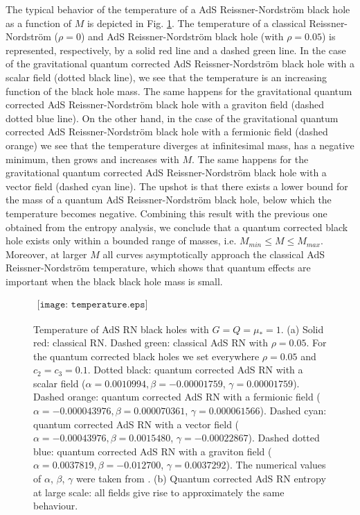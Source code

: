 \documentclass[10pt,a4paper]{article}
\begin{document}
The typical behavior of the temperature of a AdS Reissner-Nordstr\"om black hole as a function of $M$ is depicted in Fig. \ref{fig3}. The temperature of a classical Reissner-Nordstr\"om ($\rho=0$) and AdS Reissner-Nordstr\"om black hole (with $\rho=0.05$) is represented, respectively, by a solid red line and a dashed green line. 
In the case of the gravitational quantum corrected AdS Reissner-Nordstr\"om black hole with a scalar field (dotted black line), we see that the temperature is an increasing function of the black hole mass. The same happens for the gravitational quantum corrected AdS Reissner-Nordstr\"om black hole with a graviton field (dashed dotted blue line). On the other hand, in the case of the gravitational quantum corrected AdS Reissner-Nordstr\"om black hole with a fermionic field (dashed orange) we see that the temperature diverges at infinitesimal mass, has a negative minimum, then grows and increases with $M$. The same happens for the gravitational quantum corrected AdS Reissner-Nordstr\"om black hole with a vector field (dashed cyan line). The upshot is that there exists a lower bound for the mass of a quantum AdS Reissner-Nordstr\"om black hole, below which the temperature becomes negative. Combining this result with the previous one obtained from the entropy analysis, we conclude that a quantum corrected black hole exists only within a bounded range of masses, i.e. $M_{min}\leq M\leq M_{max}$.
Moreover, at larger $M$ all curves asymptotically approach the classical AdS Reissner-Nordstr\"om temperature, which shows that quantum effects are important when the black black hole mass is small.
\begin{figure}
\begin{center}$
\begin{array}{cccc}
\texttt{[image: temperature.eps]}
\end{array}$
\end{center}
\caption{Temperature of AdS RN black holes with $G=Q=\mu_{*}=1$. (a) Solid red: classical RN. Dashed green: classical AdS RN with $\rho=0.05$. For the quantum corrected black holes we set everywhere $\rho=0.05$ and $c_{2}=c_{3}=0.1$. Dotted black: quantum corrected AdS RN with a scalar field ($\alpha=0.0010994, \beta=-0.00001759$, $\gamma=0.00001759$). Dashed orange: quantum corrected AdS RN with a fermionic field ($\alpha=-0.000043976, \beta=0.000070361$, $\gamma=0.000061566$). Dashed cyan: quantum corrected AdS RN with a vector field ($\alpha=-0.00043976, \beta=0.0015480$, $\gamma=-0.00022867$). Dashed dotted blue: quantum corrected AdS RN with a graviton field ($\alpha=0.0037819, \beta=-0.012700$, $\gamma=0.0037292$). The numerical values of $\alpha$, $\beta$, $\gamma$ were taken from \cite{Donoghue:2014yha}. (b) Quantum corrected AdS RN entropy at large scale: all fields give rise to approximately the same behaviour. }
\label{fig3}
\end{figure}
\end{document}
